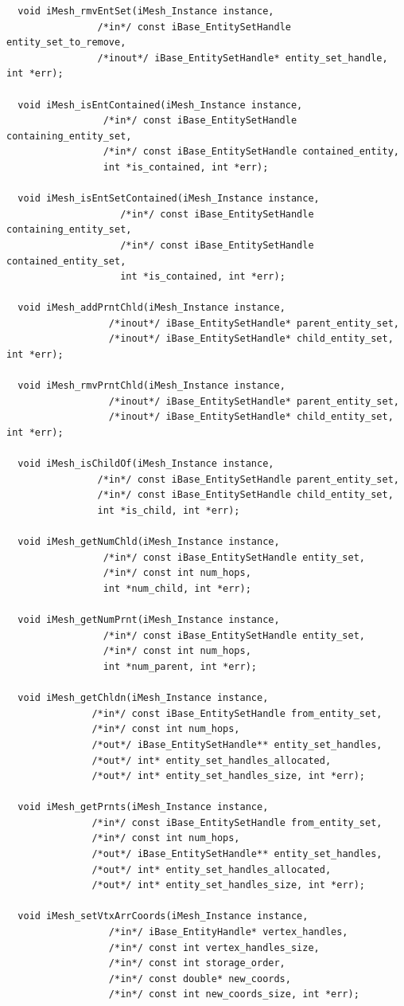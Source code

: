 \documentclass{article}
\begin{document}
\begin{small}
\begin{verbatim}
  void iMesh_rmvEntSet(iMesh_Instance instance,
			    /*in*/ const iBase_EntitySetHandle entity_set_to_remove,
			    /*inout*/ iBase_EntitySetHandle* entity_set_handle, int *err);

  void iMesh_isEntContained(iMesh_Instance instance,
				 /*in*/ const iBase_EntitySetHandle containing_entity_set,
				 /*in*/ const iBase_EntitySetHandle contained_entity,
				 int *is_contained, int *err);

  void iMesh_isEntSetContained(iMesh_Instance instance,
				    /*in*/ const iBase_EntitySetHandle containing_entity_set,
				    /*in*/ const iBase_EntitySetHandle contained_entity_set,
				    int *is_contained, int *err);

  void iMesh_addPrntChld(iMesh_Instance instance,
			      /*inout*/ iBase_EntitySetHandle* parent_entity_set,
			      /*inout*/ iBase_EntitySetHandle* child_entity_set, int *err);

  void iMesh_rmvPrntChld(iMesh_Instance instance,
			      /*inout*/ iBase_EntitySetHandle* parent_entity_set,
			      /*inout*/ iBase_EntitySetHandle* child_entity_set, int *err);

  void iMesh_isChildOf(iMesh_Instance instance,
			    /*in*/ const iBase_EntitySetHandle parent_entity_set,
			    /*in*/ const iBase_EntitySetHandle child_entity_set,
			    int *is_child, int *err);

  void iMesh_getNumChld(iMesh_Instance instance,
			     /*in*/ const iBase_EntitySetHandle entity_set,
			     /*in*/ const int num_hops,
			     int *num_child, int *err);

  void iMesh_getNumPrnt(iMesh_Instance instance,
			     /*in*/ const iBase_EntitySetHandle entity_set,
			     /*in*/ const int num_hops,
			     int *num_parent, int *err);

  void iMesh_getChldn(iMesh_Instance instance,
			   /*in*/ const iBase_EntitySetHandle from_entity_set,
			   /*in*/ const int num_hops,
			   /*out*/ iBase_EntitySetHandle** entity_set_handles,
			   /*out*/ int* entity_set_handles_allocated,
			   /*out*/ int* entity_set_handles_size, int *err);

  void iMesh_getPrnts(iMesh_Instance instance,
			   /*in*/ const iBase_EntitySetHandle from_entity_set,
			   /*in*/ const int num_hops,
			   /*out*/ iBase_EntitySetHandle** entity_set_handles,
			   /*out*/ int* entity_set_handles_allocated,
			   /*out*/ int* entity_set_handles_size, int *err);

  void iMesh_setVtxArrCoords(iMesh_Instance instance,
				  /*in*/ iBase_EntityHandle* vertex_handles,
				  /*in*/ const int vertex_handles_size,
				  /*in*/ const int storage_order,
				  /*in*/ const double* new_coords,
				  /*in*/ const int new_coords_size, int *err);



\end{verbatim}
\end{small}
\end{document}

